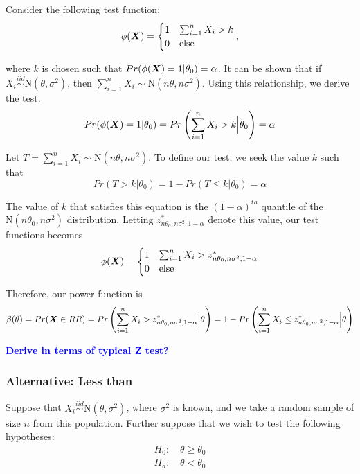 \documentclass[]{article}
\newcommand{\bfX}{\mbox{\boldmath $X$}}
\begin{document}
Consider the following test function:
\[
\phi(\bfX) = \begin{cases}
1 & \sum_{i=1}^n X_i > k \\
0 & \text{else}
\end{cases},
\]

where $k$ is chosen such that $Pr(\phi(\bfX) = 1|\theta_0) = \alpha$. It can be shown that if $X_i \stackrel{iid}{\sim} \text{N}(\theta, \sigma^2)$, then $\sum_{i=1}^{n} X_i \sim \text{N}(n\theta, n\sigma^2)$. Using this relationship, we derive the test. 
\[
\begin{split}
Pr(\phi(\bfX) = 1|\theta_0) = Pr\left(\sum_{i=1}^n X_i > k\Big|\theta_0\right) = \alpha 
\end{split}
\]

Let $T = \sum_{i=1}^{n} X_i \sim \text{N}(n\theta, n\sigma^2)$. To define our test, we seek the value $k$ such that 
\[
Pr(T > k | \theta_0) = 1 - Pr(T \leq k | \theta_0) = \alpha
\]

The value of $k$ that satisfies this equation is the $(1 - \alpha)^{th}$ quantile of the $\text{N}(n\theta_0, n\sigma^2)$ distribution. Letting $z^*_{n\theta_0, n\sigma^2, 1-\alpha}$ denote this value, our test functions becomes
\[
\phi(\bfX) = \begin{cases}
1 & \sum_{i=1}^n X_i > z^*_{n\theta_0, n\sigma^2, 1-\alpha} \\
0 & \text{else}
\end{cases}
\]

Therefore, our power function is
\[
\beta(\theta) = Pr(\bfX \in RR) = Pr\left(\sum_{i=1}^n X_i > z^*_{n\theta_0, n\sigma^2, 1-\alpha} \Big| \theta\right) = 1 - Pr\left(\sum_{i=1}^n X_i \leq z^*_{n\theta_0, n\sigma^2, 1-\alpha}  \Big| \theta\right)
\]

\textbf{\textcolor{blue}{Derive in terms of typical Z test?}}

\subsubsection{Alternative: Less than}

Suppose that $X_i \stackrel{iid}{\sim} \text{N}(\theta, \sigma^2)$, where $\sigma^2$ is known, and we take a random sample of size $n$ from this population. Further suppose that we wish to test the following hypotheses:
\[
\begin{split}
\text{$H_0$: }& \theta \geq \theta_0 \\
\text{$H_a$: }& \theta < \theta_0
\end{split}
\]
\end{document}
